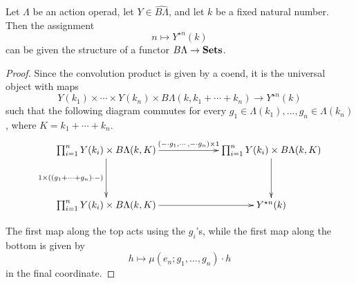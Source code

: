 \begin{lem}\label{calclem2}
Let $\Lambda$ be an action operad, let $Y \in \widehat{B\Lambda}$, and let $k$ be a fixed natural number. Then the assignment
  \[
    n \mapsto Y^{\star n}(k)
  \]
can be given the structure of a functor $B\Lambda \rightarrow \mathbf{Sets}$.
\end{lem}
\begin{proof}
Since the convolution product is given by a coend, it is the universal object with maps
  \[
    Y(k_{1}) \times \cdots \times Y(k_{n}) \times B\Lambda(k, k_{1} + \cdots + k_{n}) \rightarrow Y^{\star n}(k)
  \]
such that the following diagram commutes for every $g_{1} \in \Lambda(k_{1}), \ldots, g_{n} \in \Lambda(k_{n})$, where $K = k_1 + \cdots + k_n$.
  \[
    \xy
      (0,0)*+{\prod_{i=1}^n Y(k_i) \times B\Lambda(k,K)}="a";
      (60,0)*+{\prod_{i=1}^n Y(k_i) \times B\Lambda(k,K)}="b";
      (60,-20)*+{Y^{\star n}(k)}="c";
      (0,-20)*+{\prod_{i=1}^n Y(k_i) \times B\Lambda(k,K)}="d";
      {\ar^{(-\cdot g_1, \cdots, -\cdot g_n) \times 1} "a" ; "b"};
      {\ar_{1 \times ((g_1 + \cdots + g_n)\cdot -)} "a" ; "d"};
      {\ar "b" ; "c"};
      {\ar "d" ; "c"};
    \endxy
  \]

The first map along the top acts using the $g_{i}$'s, while the first map along the bottom is given by
  \[
    h \mapsto \mu(e_{n}; g_{1}, \ldots, g_{n}) \cdot h
  \]
in the final coordinate.


\end{proof}
